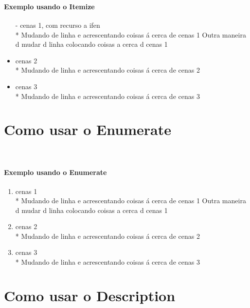 \documentclass[a4paper,11pt]{report}%
\begin{document}
\paragraph{\ \ } 
\paragraph{Exemplo usando o Itemize} 
\begin{itemize}
	\item[-] cenas 1, com recurso a ifen
	\\* Mudando de linha e acrescentando coisas á cerca de cenas 1
	\newline Outra maneira d mudar d linha colocando coisas a cerca d cenas 1
	\item cenas 2
	\\* Mudando de linha e acrescentando coisas á cerca de cenas 2
	\item cenas 3
	\\* Mudando de linha e acrescentando coisas á cerca de cenas 3
\end{itemize}

\newpage
\section{Como usar o Enumerate}
\paragraph{\ \ } 
\paragraph{Exemplo usando o Enumerate}
\begin{enumerate}
	\item cenas 1
	\\* Mudando de linha e acrescentando coisas á cerca de cenas 1
	\newline Outra maneira d mudar d linha colocando coisas a cerca d cenas 1
	\item cenas 2
	\\* Mudando de linha e acrescentando coisas á cerca de cenas 2
	\item cenas 3
	\\* Mudando de linha e acrescentando coisas á cerca de cenas 3
\end{enumerate}

\newpage
\section{Como usar o Description}
\end{document}
